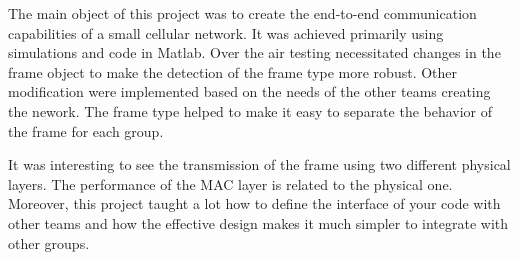 The main object of this project was to create the end-to-end communication capabilities of a small cellular network. It was achieved primarily using simulations and code in Matlab. Over the air testing necessitated changes in the frame object to make the detection of the frame type more robust. Other modification were implemented based on the needs of the other teams creating the nework. The frame type helped to make it easy to separate the behavior of the frame for each group.

It was interesting to see the transmission of the frame using two different physical layers. The performance of the MAC layer is related to the physical one. Moreover, this project taught a lot how to define the interface of your code with other teams and how the effective design makes it much simpler to integrate with other groups.  